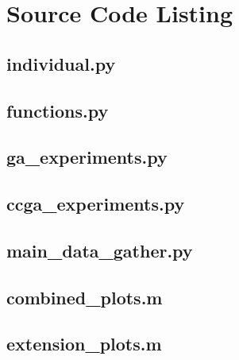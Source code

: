 \section{Source Code Listing} \label{sec:source-code-listing}

\lstlistoflistings

\subsection{individual.py} \label{lst:individual}


\subsection{functions.py} \label{lst:functions}


\subsection{ga\_experiments.py} \label{lst:ga_experiment}


\subsection{ccga\_experiments.py} \label{lst:ccga_experiment}


\subsection{main\_data\_gather.py} \label{lst:main_data_gather}


\subsection{combined\_plots.m} \label{lst:combined_plots}


\subsection{extension\_plots.m} \label{lst:extension_plots}

